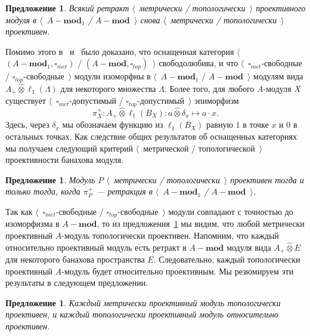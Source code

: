 \documentclass[12pt]{article}
\newcommand{\projtens}{\mathbin{\widehat{\otimes}}}
\newtheorem{proposition}[theorem]{Предложение}
\begin{document}
\begin{proposition}\label{RetrMetTopProjIsMetTopProj} Всякий ретракт
    $\langle$~метрически / топологически~$\rangle$ проективного модуля в
    $\langle$~$A-\mathbf{mod}_1$ / $A-\mathbf{mod}$~$\rangle$ снова
    $\langle$~метрически / топологически~$\rangle$ проективен.
\end{proposition}

Помимо этого в~\cite{HelMetrFrQMod} и~\cite{ShtTopFrClassicQuantMod} было
доказано, что оснащенная категория $\langle$~$(A-\mathbf{mod}_1,\square_{met})$
/ $(A-\mathbf{mod},\square_{top})$~$\rangle$ свободолюбива, и что
$\langle$~$\square_{met}$-свободные / $\square_{top}$-свободные~$\rangle$ модули
изоморфны в $\langle$~$A-\mathbf{mod}_1$ / $A-\mathbf{mod}$~$\rangle$ модулям
вида $A_+\projtens \ell_1(\Lambda)$ для некоторого множества $\Lambda$. Более
того, для любого $A$-модуля $X$ существует $\langle$~$\square_{met}$-допустимый
/ $\square_{top}$-допустимый~$\rangle$ эпиморфизм
$$
    \pi_X^+:A_+\projtens \ell_1(B_X):a\projtens \delta_x\mapsto a\cdot x.
$$
Здесь, через $\delta_x$ мы обозначаем функцию из $\ell_1(B_X)$ равную $1$ в
точке $x$ и $0$ в остальных точках. Как следствие общих результатов об
оснащенных категориях мы получаем следующий критерий  $\langle$~метрической /
топологической~$\rangle$ проективности банахова модуля.

\begin{proposition}\label{MetTopProjModViaCanonicMorph} Модуль $P$
    $\langle$~метрически / топологически~$\rangle$ проективен тогда и только
    тогда, когда  $\pi_P^+$ --- ретракция в $\langle$~$A-\mathbf{mod}_1$ /
    $A-\mathbf{mod}$~$\rangle$.
\end{proposition}

Так как $\langle$~$\square_{met}$-свободные /
$\square_{top}$-свободные~$\rangle$ модули совпадают с точностью до изоморфизма
в $A-\mathbf{mod}$, то из предложения~\ref{RetrMetTopProjIsMetTopProj} мы видим,
что любой метрически проективный $A$-модуль топологически проективен. Напомним,
что каждый относительно проективный модуль есть ретракт в $A-\mathbf{mod}$
модуля вида $A_+\projtens E$ для некоторого банахова пространства $E$.
Следовательно, каждый топологически проективный $A$-модуль будет относительно
проективным. Мы резюмируем эти результаты в следующем предложении.

\begin{proposition}\label{MetProjIsTopProjAndTopProjIsRelProj} Каждый метрически
    проективный модуль топологически проективен, и каждый топологически
    проективный модуль относительно проективен.
\end{proposition}
\end{document}
